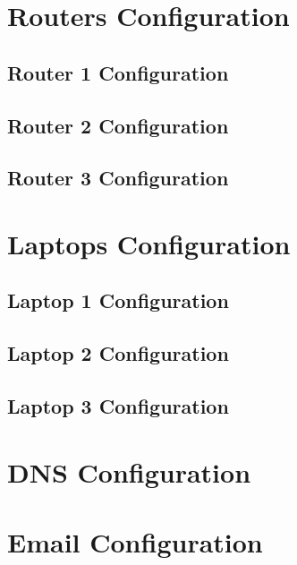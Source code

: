 \appendix

\begingroup

\chapter{Routers Configuration}
\label{app:routers}

\section{Router 1 Configuration}
\label{app:sec:router1}

\clearpage

\section{Router 2 Configuration}
\label{app:sec:router2}

\clearpage

\section{Router 3 Configuration}
\label{app:sec:router3}

\clearpage



\chapter{Laptops Configuration}
\label{app:laptops}

\section{Laptop 1 Configuration}
\label{app:sec:laptop1}
\clearpage

\section{Laptop 2 Configuration}
\label{app:sec:laptop2}
\clearpage

\section{Laptop 3 Configuration}
\label{app:sec:laptop3}


\chapter{DNS Configuration}


\chapter{Email Configuration}
\label{app:email}

\endgroup
